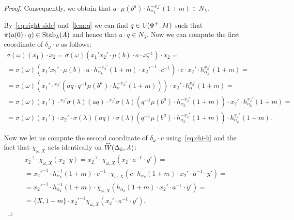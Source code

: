 \begin{cor}
\begin{proof}
 Consequently, we obtain that
  $a \cdot \mu(b^a) \cdot h_{\alpha_k}^{-{x_2'}}(1+m) \in {N_{\lambda}}$.

 By~\eqref{eq:right-side} and~\cref{lem:q} we can find $q \in \operatorname{U}(\Phi^+, M)$ such that $\pi(a(0) \cdot q) \in \operatorname{Stab}_\lambda(A)$ and hence
     that $a \cdot q \in N_\lambda$.
 Now we can compute the first coordinate of $\delta_\omega \cdot v$ as follows:
 \begin{multline} \label{eq:intermediate}
  \sigma(\omega)(x_1) \cdot x_2 = \sigma(\omega)(x_1'x_2' \cdot \mu(b) \cdot a \cdot x_2^{-1}) \cdot x_2 = \\
   = \sigma(\omega)(x_1'x_2' \cdot \mu(b) \cdot a \cdot h^{-{x_2'}}_{\alpha_k}(1+m) \cdot {x_2'}^{-1} \cdot c^{-1}) \cdot c \cdot x_2' \cdot h_{\alpha_k}^{x_2'}(1+m) = \\
   = \sigma(\omega)\left(x_1'\cdot {}^{x_2'} (aq \cdot q^{-1} \mu(b^a) \cdot h^{-x_2'}_\alpha(1+m))\right) \cdot x_2' \cdot h_{\alpha}^{x_2'}(1+m) = \\
   = \sigma(\omega)(x_1') \cdot {}^{x_2'}\sigma(\lambda)(aq) \cdot {}^{x_2'}\sigma(\lambda)(q^{-1} \mu(b^a) \cdot h^{-x_2'}_{\alpha_k}(1+m)) \cdot x_2' \cdot h^{x_2'}_{\alpha_k}(1+m) = \\
   = \sigma(\omega)(x_1') \cdot x_2' \cdot \sigma(\lambda)(aq) \cdot \sigma(\lambda)\left(q^{-1} \mu(b^a) \cdot h^{-x_2'}_{\alpha_k}(1+m)\right) \cdot h^{x_2'}_{\alpha_k}(1+m).
 \end{multline}

 Now we let us compute the second coordinate of $\delta_\omega \cdot v$ using~\eqref{eq:chi-h} and the fact that
 $\chi_{\omega, X}$ acts identically on $\widehat{W}(\Delta_k, A)$:
 \begin{multline}\label{eq:intermediate2}
 x_2^{-1}\cdot \chi_{\omega, X}(x_2 \cdot y) = x_2^{-1} \cdot \chi_{\omega, X}(x_2 \cdot a^{-1} \cdot y') = \\
 = {x_2'}^{-1} \cdot h_{\alpha_k}^{-1}(1 + m) \cdot c^{-1} \cdot \chi_{\omega, X}(c \cdot h_{\alpha_k}(1 + m) \cdot x_2' \cdot a^{-1} \cdot y') = \\
 = {x_2'}^{-1} \cdot h_{\alpha_k}^{-1}(1 + m) \cdot \chi_{\omega, X}(h_{\alpha_k}(1 + m) \cdot x_2' \cdot a^{-1} \cdot y') = \\
 = \{X, 1+m\} \cdot {x_2'}^{-1} \chi_{\omega, X}(x_2' \cdot a^{-1} \cdot y').
 \end{multline}


\end{proof}
\end{cor}
